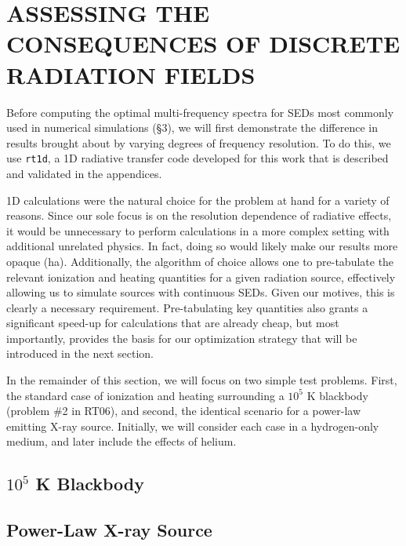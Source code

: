 \documentclass[preprint2]{aastex}              %
\begin{document}

\section{ASSESSING THE CONSEQUENCES OF DISCRETE RADIATION FIELDS}
Before computing the optimal multi-frequency spectra for SEDs most commonly used in numerical simulations (\S3), we will first demonstrate the difference in results brought about by varying degrees of frequency resolution.  To do this, we use \texttt{rt1d}, a 1D radiative transfer code developed for this work that is described and validated in the appendices.  

1D calculations were the natural choice for the problem at hand for a variety of reasons.  Since our sole focus is on the resolution dependence of radiative effects, it would be unnecessary to perform calculations in a more complex setting with additional unrelated physics.  In fact, doing so would likely make our results more opaque (ha).  Additionally, the algorithm of choice allows one to pre-tabulate the relevant ionization and heating quantities for a given radiation source, effectively allowing us to simulate sources with continuous SEDs.  Given our motives, this is clearly a necessary requirement.  Pre-tabulating key quantities also grants a significant speed-up for calculations that are already cheap, but most importantly, provides the basis for our optimization strategy that will be introduced in the next section.

In the remainder of this section, we will focus on two simple test problems.  First, the standard case of ionization and heating surrounding a $10^5$ K blackbody (problem \#2 in RT06), and second, the identical scenario for a power-law emitting X-ray source.  Initially, we will consider each case in a hydrogen-only medium, and later include the effects of helium.

\subsection{$10^5$ K Blackbody}



\subsection{Power-Law X-ray Source}
\end{document}
